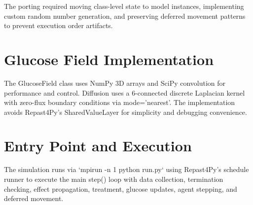 The porting required moving class-level state to model instances, implementing custom random number generation, and preserving deferred movement patterns to prevent execution order artifacts.

\section{Glucose Field Implementation}
\label{sec:glucose-field-impl}

The GlucoseField class uses NumPy 3D arrays and SciPy convolution for performance and control. Diffusion uses a 6-connected discrete Laplacian kernel with zero-flux boundary conditions via mode='nearest'. The implementation avoids Repast4Py's SharedValueLayer for simplicity and debugging convenience.

\section{Entry Point and Execution}
\label{sec:entry-point}

The simulation runs via `mpirun -n 1 python run.py` using Repast4Py's schedule runner to execute the main step() loop with data collection, termination checking, effect propagation, treatment, glucose updates, agent stepping, and deferred movement.

